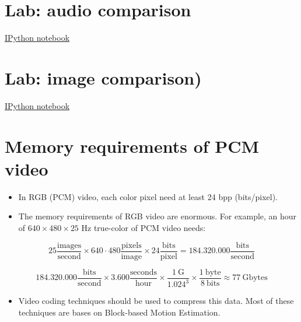 \section{Lab: audio comparison}
\href{https://nbviewer.jupyter.org/github/vicente-gonzalez-ruiz/why_to_compress/blob/master/audio_comparison.ipynb}{IPython notebook}

\section{Lab: image comparison)}
\href{https://nbviewer.jupyter.org/github/vicente-gonzalez-ruiz/why_to_compress/blob/master/image_comparison.ipynb}{IPython notebook}

\section{Memory requirements of PCM video}

\begin{itemize}
\item In RGB (PCM) video, each color pixel need at least 24 bpp
  (bits/pixel).
\item The memory requirements of RGB video are enormous. For example,
  an hour of \(640\times 480\times 25\) Hz true-color of PCM video
  needs:
\end{itemize}

\begin{equation}
  25\frac{\text{images}}{\text{second}}\times 640\cdot
  480\frac{\text{pixels}}{\text{image}}\times
  24\frac{\text{bits}}{\text{pixel}}=
  184{.}320{.}000\frac{\text{bits}}{\text{second}}
\end{equation}

\begin{equation}
  184{.}320{.}000\frac{\text{bits}}{\text{second}} \times
  3{.}600\frac{\text{seconds}}{\text{hour}} \times
  \frac{1~\text{G}}{1{.}024^3}\times
  \frac{1~\text{byte}}{8~\text{bits}} \approx 77~\text{Gbytes}
\end{equation}

\begin{itemize}
\item Video coding techniques should be used to compress this data. Most of these techniques are bases on Block-based Motion Estimation.
\end{itemize}

